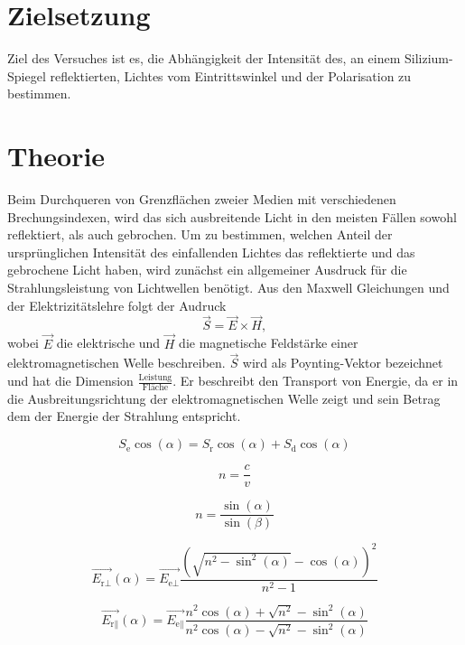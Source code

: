 \section{Zielsetzung}
\label{sec:Zielsetzung}

Ziel des Versuches ist es, die Abhängigkeit der Intensität des, an einem Silizium-Spiegel reflektierten, Lichtes vom Eintrittswinkel und der Polarisation zu bestimmen. 

\section{Theorie}
\label{sec:Theorie}

Beim Durchqueren von Grenzflächen zweier Medien mit verschiedenen Brechungsindexen, wird das sich ausbreitende Licht in den meisten Fällen sowohl reflektiert, als
auch gebrochen. Um zu bestimmen, welchen Anteil der ursprünglichen Intensität des einfallenden Lichtes das reflektierte und das gebrochene Licht haben, wird
zunächst ein allgemeiner Ausdruck für die Strahlungsleistung von Lichtwellen benötigt.
\newline
Aus den Maxwell Gleichungen und der Elektrizitätslehre folgt der Audruck 
\begin{equation}
    \vec{S} = \vec{E} \times \vec{H},
\end{equation}
wobei $\vec{E}$ die elektrische und $\vec{H}$ die magnetische Feldstärke einer elektromagnetischen Welle beschreiben. $\vec{S}$ wird als Poynting-Vektor bezeichnet
und hat die Dimension $\frac{\text{Leistung}}{\text{Fläche}}$. Er beschreibt den Transport von Energie, da er in die Ausbreitungsrichtung der elektromagnetischen
Welle zeigt und sein Betrag dem der Energie der Strahlung entspricht.

\begin{equation}
    S_\text{e} \cos(\alpha) = S_\text{r} \cos(\alpha) + S_\text{d} \cos(\alpha)
\end{equation}

\begin{equation}
    n = \frac{c}{v}
\end{equation}

\begin{equation}
    n = \frac{\sin(\alpha)}{\sin(\beta)}
\end{equation}

\begin{equation}
    \vec{E_{\text{r}\perp}}(\alpha) = \vec{E_{\text{e}\perp}} \frac{(\sqrt{n^2 - \sin^2(\alpha)} - \cos(\alpha))^2}{n^2 - 1}
    \label{eqn:fresnelsenk}
\end{equation}

\begin{equation}
    \vec{E_{\text{r}\parallel}}(\alpha) = \vec{E_{\text{e}\parallel}} \frac{n^2 \cos(\alpha) + \sqrt{n^2} - \sin^2(\alpha)}{n^2 \cos(\alpha) - \sqrt{n^2} - \sin^2(\alpha)}
    \label{eqn:fresnelpara}
\end{equation}

\cite{sample}
